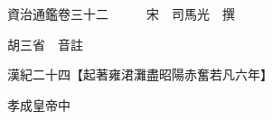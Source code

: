 










 


 
 


 

  
  
  
  
  





  
  
  
  
  
 
  

  

  
  
  



  

 
 

  
   




  

  
  


  　　資治通鑑卷三十二　　　宋　司馬光　撰

　　胡三省　音註

　　漢紀二十四【起著雍涒灘盡昭陽赤奮若凡六年】

　　孝成皇帝中

